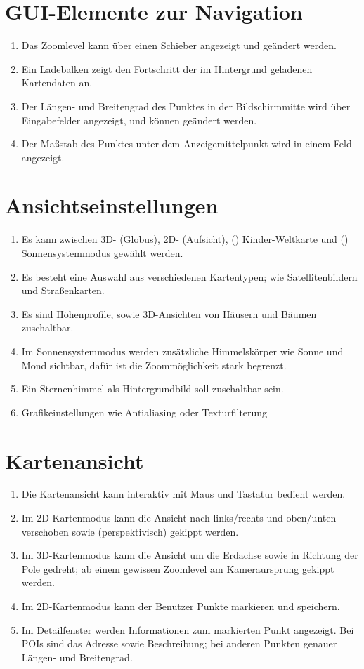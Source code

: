 \documentclass[10pt]{scrreprt}
\begin{document}
\section{GUI-Elemente zur Navigation}
\begin{enumerate}[leftmargin=2cm,resume]
\item Das Zoomlevel kann über einen Schieber angezeigt und geändert werden.
\item Ein Ladebalken zeigt den Fortschritt der im Hintergrund geladenen Kartendaten an.
\item Der Längen- und Breitengrad des Punktes in der Bildschirmmitte wird über Eingabefelder angezeigt, und können geändert werden.
\item Der Maßstab des Punktes unter dem Anzeigemittelpunkt wird in einem Feld angezeigt.
\end{enumerate}

\section{Ansichtseinstellungen}
\begin{enumerate}[leftmargin=2cm,resume]
\item Es kann zwischen 3D- (Globus), 2D- (Aufsicht), (\W) Kinder-Weltkarte und (\W) Sonnensystemmodus gewählt werden.
\item Es besteht eine Auswahl aus verschiedenen Kartentypen; wie Satellitenbildern und Straßenkarten.
\item \W Es sind Höhenprofile, sowie 3D-Ansichten von Häusern und 
Bäumen zuschaltbar.
\item \W Im Sonnensystemmodus werden zusätzliche Himmelskörper wie Sonne und Mond sichtbar, dafür ist die Zoommöglichkeit stark begrenzt.
\item \W Ein Sternenhimmel als Hintergrundbild soll zuschaltbar sein.
\item \W Grafikeinstellungen wie Antialiasing oder Texturfilterung
\end{enumerate}

\section{Kartenansicht}
\begin{enumerate}[leftmargin=2cm,resume]
\item Die Kartenansicht kann interaktiv mit Maus und Tastatur bedient werden.
\item Im 2D-Kartenmodus kann die Ansicht nach links/rechts und oben/unten verschoben sowie (perspektivisch) gekippt werden. 
\item Im 3D-Kartenmodus kann die Ansicht um die Erdachse sowie in Richtung der Pole gedreht; ab einem gewissen Zoomlevel am Kameraursprung gekippt werden.
\item \W Im 2D-Kartenmodus kann der Benutzer Punkte markieren und speichern.
\item Im Detailfenster werden Informationen zum markierten Punkt angezeigt. Bei POIs sind das Adresse sowie Beschreibung; bei anderen Punkten genauer Längen- und Breitengrad.
\end{enumerate}
\end{document}
